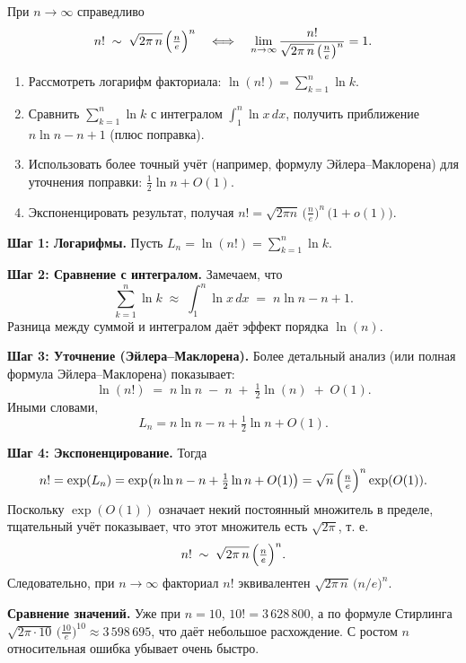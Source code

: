 
\begin{customtheorem}
	При $n\to\infty$ справедливо
	\[
		n! \;\sim\;\sqrt{2\pi\,n}
		\,\Bigl(\tfrac{n}{e}\Bigr)^n
		\quad\Longleftrightarrow\quad
		\lim_{n\to\infty} \frac{n!}{\sqrt{2\pi\,n}\,\bigl(\tfrac{n}{e}\bigr)^n}=1.
	\]
\end{customtheorem}

\begin{proofplan}
	\begin{enumerate}
		\item Рассмотреть логарифм факториала: $\ln(n!)=\sum_{k=1}^n \ln k$.
		\item Сравнить $\sum_{k=1}^n \ln k$ с интегралом $\int_{1}^{n}\ln x\,dx$,
		      получить приближение $n\ln n - n + 1$ (плюс поправка).
		\item Использовать более точный учёт (например, формулу Эйлера–Маклорена) для
		      уточнения поправки: $\tfrac12\ln n + O(1)$.
		\item Экспоненцировать результат, получая
		      $n! = \sqrt{2\pi n}\,\bigl(\frac{n}{e}\bigr)^n \,\bigl(1+o(1)\bigr).$
	\end{enumerate}
\end{proofplan}

\begin{customproof}
	\textbf{Шаг 1: Логарифмы.}
	Пусть $L_n=\ln(n!)=\sum_{k=1}^n \ln k.$

	\smallskip

	\textbf{Шаг 2: Сравнение с интегралом.}
	Замечаем, что
	\[
		\sum_{k=1}^n \ln k
		\;\approx\;
		\int_{1}^{n} \ln x \,dx
		\;=\; n\ln n - n + 1.
	\]
	Разница между суммой и интегралом даёт эффект порядка $\ln(n)$.

	\smallskip

	\textbf{Шаг 3: Уточнение (Эйлера–Маклорена).}
	Более детальный анализ (или полная формула Эйлера–Маклорена) показывает:
	\[
		\ln(n!)
		\;=\;
		n\ln n \;-\; n
		\;+\;\tfrac12\ln(n)
		\;+\; O(1).
	\]
	Иными словами,
	\[
		L_n
		= n\ln n - n + \tfrac12\ln n + O(1).
	\]

	\smallskip

	\textbf{Шаг 4: Экспоненцирование.}
	Тогда
	\[
		n!
		=
		\exp(L_n)
		=
		\exp\bigl(n\ln n - n + \tfrac12\ln n + O(1)\bigr)
		=
		\sqrt{n}\,\Bigl(\tfrac{n}{e}\Bigr)^n \exp(O(1)).
	\]
	Поскольку $\exp(O(1))$ означает некий постоянный множитель в пределе,
	тщательный учёт показывает, что этот множитель есть $\sqrt{2\pi}$, т. е.
	\[
		n! \;\sim\;\sqrt{2\pi\,n}\,\Bigl(\tfrac{n}{e}\Bigr)^n.
	\]
	Следовательно, при $n\to\infty$ факториал $n!$ эквивалентен $\sqrt{2\pi\,n}\,\bigl(n/e\bigr)^n$.
\end{customproof}

\begin{customexample}
	\textbf{Сравнение значений.}
	Уже при $n=10$, $10! = 3\,628\,800$, а по формуле Стирлинга
	$\sqrt{2\pi\cdot 10}\,\bigl(\tfrac{10}{e}\bigr)^{10} \approx 3\,598\,695$,
	что даёт небольшое расхождение. С ростом $n$ относительная ошибка убывает очень быстро.
\end{customexample}
